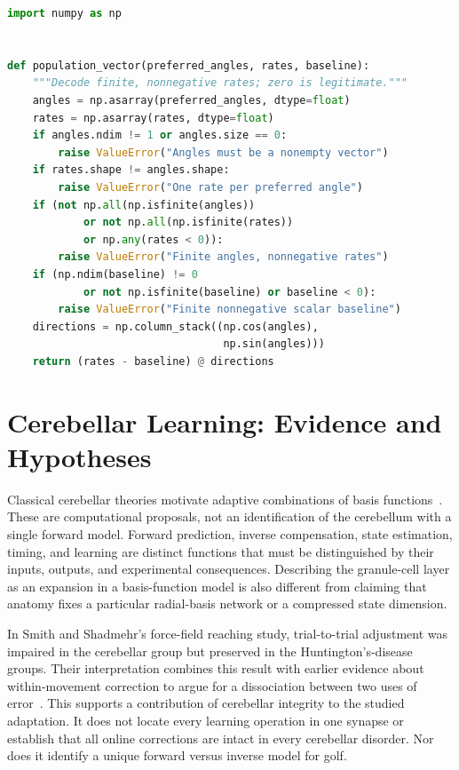 \begin{lstlisting}[language=Python, caption={A Baseline-Corrected Planar Decoder}]
import numpy as np


def population_vector(preferred_angles, rates, baseline):
    """Decode finite, nonnegative rates; zero is legitimate."""
    angles = np.asarray(preferred_angles, dtype=float)
    rates = np.asarray(rates, dtype=float)
    if angles.ndim != 1 or angles.size == 0:
        raise ValueError("Angles must be a nonempty vector")
    if rates.shape != angles.shape:
        raise ValueError("One rate per preferred angle")
    if (not np.all(np.isfinite(angles))
            or not np.all(np.isfinite(rates))
            or np.any(rates < 0)):
        raise ValueError("Finite angles, nonnegative rates")
    if (np.ndim(baseline) != 0
            or not np.isfinite(baseline) or baseline < 0):
        raise ValueError("Finite nonnegative scalar baseline")
    directions = np.column_stack((np.cos(angles),
                                  np.sin(angles)))
    return (rates - baseline) @ directions
\end{lstlisting}

\section{Cerebellar Learning: Evidence and Hypotheses}

Classical cerebellar theories motivate adaptive combinations of basis
functions~\cite{Marr1969,Albus1971,Kawato1987}. These are computational proposals,
not an identification of the cerebellum with a single forward model. Forward
prediction, inverse compensation, state estimation, timing, and learning are
distinct functions that must be distinguished by their inputs, outputs, and
experimental consequences. Describing the granule-cell layer as an expansion
in a basis-function model is also different from claiming that anatomy fixes
a particular radial-basis network or a compressed state dimension.

In Smith and Shadmehr's force-field reaching study, trial-to-trial adjustment
was impaired in the cerebellar group but preserved in the Huntington's-disease
groups. Their interpretation combines this result with earlier evidence about
within-movement correction to argue for a dissociation between two uses of
error~\cite{SmithShadmehr2005}. This supports a contribution of cerebellar
integrity to the studied adaptation. It does not locate every learning
operation in one synapse or establish that all online corrections are intact
in every cerebellar disorder. Nor does it identify a unique forward versus
inverse model for golf.


